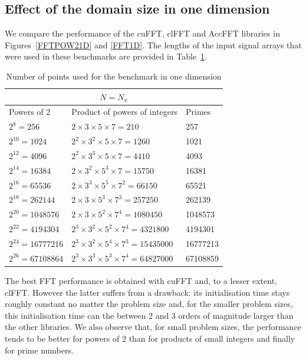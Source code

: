 \documentclass[12pt, a4paper]{article}
\begin{document}
\subsection{Effect of the domain size in one dimension}\label{PERFORMANCE1D}
We compare the performance of the cuFFT, clFFT and AccFFT libraries in
Figures~\ref{FFTPOW21D} and \ref{FFT1D}. The lengths of the input
signal arrays that were used in these benchmarks are provided in
Table~\ref{1DSIZES}.


\begin{table}[H]
\centering
\begin{tabular}{|l|l|l|}
  \hline
  \multicolumn{3}{|c|}{$N=N_x$}\\
  \hline
  \hline
Powers of 2 & Product of powers of integers & Primes\\ \hline
$2^8=256$ & $2\times 3\times 5\times 7 = 210$	& 257 \\ \hline
$2^{10}=1024$ & $2^2\times 3^2\times 5\times 7 = 1260$ & 1021 \\ \hline
$2^{12}=4096$ & $2^2\times 3^3\times 5\times 7 = 4410$ & 4093 \\ \hline
$2^{14}=16384$ & $2\times 3^2\times 5^3\times 7=15750$ & 16381 \\ \hline
$2^{16}=65536$ & $2\times 3^3\times 5^5\times 7^2 = 66150$ & 65521 \\ \hline
$2^{18}=262144$ & $2\times 3\times 5^3\times 7^3 = 257250$ & 262139 \\ \hline
$2^{20}=1048576$ & $2\times 3\times 5^2\times 7^4 = 1080450$ & 1048573 \\ \hline
$2^{22}=4194304$ & $2^3\times 3^2\times 5^2\times 7^4 = 4321800$ & 4194301 \\ \hline
$2^{24}=16777216$ & $2^3\times 3^2\times 5^4\times 7^3 = 15435000$ & 16777213 \\ \hline
$2^{26}=67108864$ & $2^3\times 3^3\times  5^3\times  7^4 = 64827000$ & 67108859 \\ \hline
\end{tabular}
\caption{Number of points used for the benchmark in one dimension}\label{1DSIZES}
\end{table}

The best FFT performance is obtained with cuFFT and, to a lesser
extent, clFFT. However the latter suffers from a drawback: its
initialisation time stays roughly constant no matter the problem size
and, for the smaller problem sizes, this initialisation time can the
between 2 and 3 orders of magnitude larger than the other libraries.
We also observe that, for small problem sizes, the performance
tends to be better for powers of 2 than for products of small
integers and finally for prime numbers.
  
\end{document}
